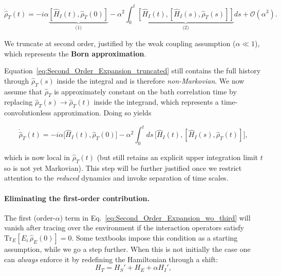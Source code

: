 \begin{equation}
	\dot{\hat{\rho}}_T(t) = -i \alpha \underbrace{\left[ \hat{H}_I(t), \hat{\rho}_T(0) \right]}_{\text{(1)}}
	- \alpha^2 \int_0^t \underbrace{\left[ \hat{H}_I(t), \left[ \hat{H}_I(s), \hat{\rho}_T(s) \right] \right]}_{\text{(2)}} ds + \mathcal{O} (\alpha^3).
	\label{eq:Second_Order_Expansion_truncated}
\end{equation}

\noindent
We truncate at second order, justified by the weak coupling assumption ($\alpha \ll 1$), which represents the \textbf{Born approximation}.

\noindent
Equation~\eqref{eq:Second_Order_Expansion_truncated} still contains the full history through $\hat{\rho}_T(s)$ inside the integral and is therefore \emph{non-Markovian}. We now assume that $\hat{\rho}_T$ is approximately constant on the bath correlation time by replacing $\hat{\rho}_T(s) \to \hat{\rho}_T(t)$ inside the integrand, which represents a time-convolutionless approximation. Doing so yields

\begin{equation}
	\dot{\hat{\rho}}_T(t) = -i \alpha \big[ \hat{H}_I(t), \hat{\rho}_T(0) \big]
	- \alpha^2 \int_0^t ds\, \big[ \hat{H}_I(t), [ \hat{H}_I(s), \hat{\rho}_T(t)] \big],
	\label{eq:Second_Order_Expansion_wo_third}
\end{equation}

\noindent
which is now local in $\hat{\rho}_T(t)$ (but still retains an explicit upper integration limit $t$ so is not yet Markovian). This step will be further justified once we restrict attention to the \emph{reduced} dynamics and invoke separation of time scales.

\paragraph{Eliminating the first-order contribution.}

\noindent
The first (order-$\alpha$) term in Eq.~\eqref{eq:Second_Order_Expansion_wo_third} will vanish after tracing over the environment if the interaction operators satisfy $\mathrm{Tr}_E[E_i \, \hat{\rho}_E(0)] = 0$. Some textbooks impose this condition as a starting assumption, while we go a step further. When this is not initially the case one can \emph{always} enforce it by redefining the Hamiltonian through a shift:
\begin{equation}
	H_T = H_S' + H_E + \alpha H_I',
	\label{eq:Shifted_Total_Hamiltonian}
\end{equation}

